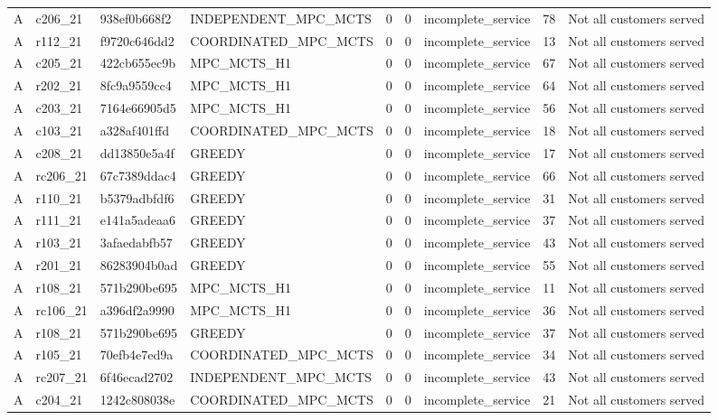 \begin{table}
{\begin{tabular}{llllrrlrl}
A & c206\_21 & 938ef0b668f2 & INDEPENDENT\_MPC\_MCTS & 0 & 0 & incomplete\_service & 78 & Not all customers served \\
A & r112\_21 & f9720c646dd2 & COORDINATED\_MPC\_MCTS & 0 & 0 & incomplete\_service & 13 & Not all customers served \\
A & c205\_21 & 422cb655ec9b & MPC\_MCTS\_H1 & 0 & 0 & incomplete\_service & 67 & Not all customers served \\
A & r202\_21 & 8fc9a9559cc4 & MPC\_MCTS\_H1 & 0 & 0 & incomplete\_service & 64 & Not all customers served \\
A & c203\_21 & 7164e66905d5 & MPC\_MCTS\_H1 & 0 & 0 & incomplete\_service & 56 & Not all customers served \\
A & c103\_21 & a328af401ffd & COORDINATED\_MPC\_MCTS & 0 & 0 & incomplete\_service & 18 & Not all customers served \\
A & c208\_21 & dd13850e5a4f & GREEDY & 0 & 0 & incomplete\_service & 17 & Not all customers served \\
A & rc206\_21 & 67c7389ddac4 & GREEDY & 0 & 0 & incomplete\_service & 66 & Not all customers served \\
A & r110\_21 & b5379adbfdf6 & GREEDY & 0 & 0 & incomplete\_service & 31 & Not all customers served \\
A & r111\_21 & e141a5adeaa6 & GREEDY & 0 & 0 & incomplete\_service & 37 & Not all customers served \\
A & r103\_21 & 3afaedabfb57 & GREEDY & 0 & 0 & incomplete\_service & 43 & Not all customers served \\
A & r201\_21 & 86283904b0ad & GREEDY & 0 & 0 & incomplete\_service & 55 & Not all customers served \\
A & r108\_21 & 571b290be695 & MPC\_MCTS\_H1 & 0 & 0 & incomplete\_service & 11 & Not all customers served \\
A & rc106\_21 & a396df2a9990 & MPC\_MCTS\_H1 & 0 & 0 & incomplete\_service & 36 & Not all customers served \\
A & r108\_21 & 571b290be695 & GREEDY & 0 & 0 & incomplete\_service & 37 & Not all customers served \\
A & r105\_21 & 70efb4e7ed9a & COORDINATED\_MPC\_MCTS & 0 & 0 & incomplete\_service & 34 & Not all customers served \\
A & rc207\_21 & 6f46ecad2702 & INDEPENDENT\_MPC\_MCTS & 0 & 0 & incomplete\_service & 43 & Not all customers served \\
A & c204\_21 & 1242c808038e & COORDINATED\_MPC\_MCTS & 0 & 0 & incomplete\_service & 21 & Not all customers served \\

\end{tabular}}
\end{table}
